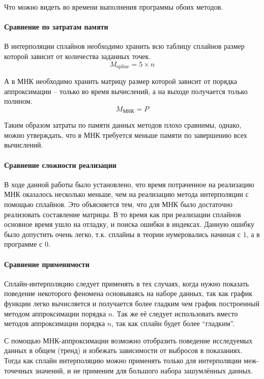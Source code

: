\documentclass[a4paper]{article}
\begin{document}
Что можно видеть во времени выполнения программы обоих методов.

\paragraph{Сравнение по затратам памяти}
В интерполяции сплайнов необходимо хранить всю таблицу сплайнов размер которой зависит от количества заданных точек.
\begin{equation}
    M_{\text{spline}} = 5 \times n
\end{equation}

А в МНК необходимо хранить матрицу размер которой зависит от порядка аппроксимации -- только во время вычислений, а на выходе получается только полином.
\begin{equation}
    M_{\text{МНК}} = P
\end{equation}

Таким образом затраты по памяти данных методов плохо сравнимы, однако, можно утверждать, что в МНК требуется меньше памяти по завершению всех вычислений.

\paragraph{Сравнение сложности реализации}
В ходе данной работы было установлено, что время потраченное на реализацию МНК оказалось несколько меньше, чем на реализацию метода интерполяции с помощью сплайнов. Это объясняется тем, что для МНК было достаточно реализовать составление матрицы. В то время как при реализации сплайнов основное время ушло на отладку, и поиска ошибки в индексах. Данную ошибку было допустить очень легко, т.к. сплайны в теории нумеровались начиная с $1$, а в программе с $0$.

\paragraph{Сравнение применимости}
Сплайн-интерполяцию следует применять в тех случаях, когда нужно показать поведение некоторого феномена основываясь на наборе данных, так как график функции легко вычисляется и получается более гладким чем график построенный методом аппроксимации порядка $n$. Так же её следует использовать вместо методов аппроксимации порядка $n$, так как сплайн будет более ``гладким''.

С помощью МНК-аппроксимации возможно отобразить поведение исследуемых данных в общем (тренд) и избежать зависимости от выбросов в показаниях. Тогда как сплайн интерполяцию можно применять только для интерполяции меж-точечных значений, и не применим для большого набора зашумлённых данных.
\end{document}

